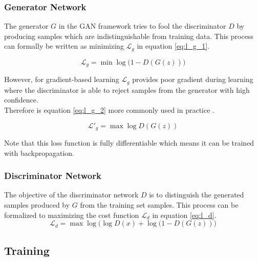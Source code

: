 \subsubsection{Generator Network}
The generator $G$ in the GAN framework tries to fool the discriminator $D$ by producing samples which are indistinguishable from training data.
This process can formally be written as minimizing $\mathcal{L}_g$ in equation \ref{eq:l_g_1}.

\begin{equation}
  \label{eq:l_g_1}
  \mathcal{L}_g = \min \log\bigg(1 - D(G(z))\bigg)
\end{equation}

However, for gradient-based learning $\mathcal{L}_g$ provides poor gradient during learning  where the discriminator is able to reject samples from the generator with high confidence.\\
Therefore is equation \ref{eq:l_g_2} more commonly used in practice .

\begin{equation}
  \label{eq:l_g_2}
  \mathcal{L'}_g = \max \log D(G(z))
\end{equation}

Note that this loss function is fully differentiable which means it can be trained with backpropagation.



\subsubsection{Discriminator Network}
The objective of the discriminator network $D$ is to distinguish the generated samples produced by $G$ from the training set samples.
This process can be formalized to maximizing the cost function $\mathcal{L}_d$ in equation \ref{eq:l_d}.
\begin{equation}
  \label{eq:l_d}
  \mathcal{L}_d = \max \log\big(\log D(x) + \log (1 - D(G(z))\big)
\end{equation}



\subsection{Training}
\label{sub:gan_training}

